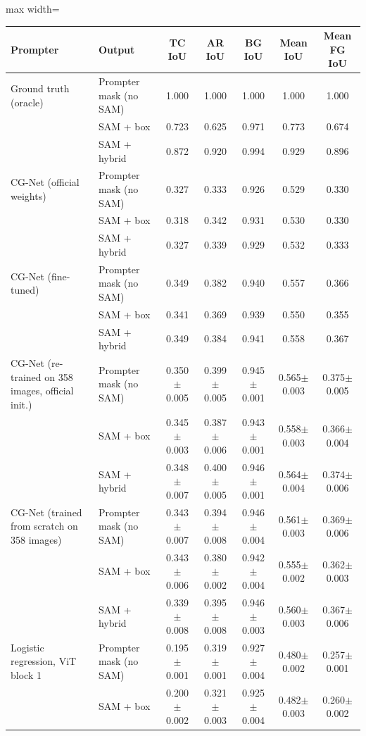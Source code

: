 \begin{table}[htbp]
\centering
\small
\begin{adjustbox}{max width=\linewidth}
\begin{tabular}{llccccc}
\toprule
Prompter & Output & TC IoU & AR IoU & BG IoU & Mean IoU & Mean FG IoU \\
\midrule
Ground truth (oracle) & Prompter mask (no SAM) & 1.000 & 1.000 & 1.000 & 1.000 & 1.000 \\
 & SAM + box & 0.723 & 0.625 & 0.971 & 0.773 & 0.674 \\
 & SAM + hybrid & 0.872 & 0.920 & 0.994 & 0.929 & 0.896 \\
\midrule
CG-Net (official weights) & Prompter mask (no SAM) & 0.327 & 0.333 & 0.926 & 0.529 & 0.330 \\
 & SAM + box & 0.318 & 0.342 & 0.931 & 0.530 & 0.330 \\
 & SAM + hybrid & 0.327 & 0.339 & 0.929 & 0.532 & 0.333 \\
\midrule
CG-Net (fine-tuned) & Prompter mask (no SAM) & 0.349 & 0.382 & 0.940 & 0.557 & 0.366 \\
 & SAM + box & 0.341 & 0.369 & 0.939 & 0.550 & 0.355 \\
 & SAM + hybrid & 0.349 & 0.384 & 0.941 & 0.558 & 0.367 \\
\midrule
CG-Net (re-trained on 358 images, official init.) & Prompter mask (no SAM) & 0.350$\pm$0.005 & 0.399$\pm$0.005 & 0.945$\pm$0.001 & 0.565$\pm$0.003 & 0.375$\pm$0.005 \\
 & SAM + box & 0.345$\pm$0.003 & 0.387$\pm$0.006 & 0.943$\pm$0.001 & 0.558$\pm$0.003 & 0.366$\pm$0.004 \\
 & SAM + hybrid & 0.348$\pm$0.007 & 0.400$\pm$0.005 & 0.946$\pm$0.001 & 0.564$\pm$0.004 & 0.374$\pm$0.006 \\
\midrule
CG-Net (trained from scratch on 358 images) & Prompter mask (no SAM) & 0.343$\pm$0.007 & 0.394$\pm$0.008 & 0.946$\pm$0.004 & 0.561$\pm$0.003 & 0.369$\pm$0.006 \\
 & SAM + box & 0.343$\pm$0.006 & 0.380$\pm$0.002 & 0.942$\pm$0.004 & 0.555$\pm$0.002 & 0.362$\pm$0.003 \\
 & SAM + hybrid & 0.339$\pm$0.008 & 0.395$\pm$0.008 & 0.946$\pm$0.003 & 0.560$\pm$0.003 & 0.367$\pm$0.006 \\
\midrule
Logistic regression, ViT block 1 & Prompter mask (no SAM) & 0.195$\pm$0.001 & 0.319$\pm$0.001 & 0.927$\pm$0.004 & 0.480$\pm$0.002 & 0.257$\pm$0.001 \\
 & SAM + box & 0.200$\pm$0.002 & 0.321$\pm$0.003 & 0.925$\pm$0.004 & 0.482$\pm$0.003 & 0.260$\pm$0.002 \\

\end{tabular}
\end{adjustbox}
\end{table}
